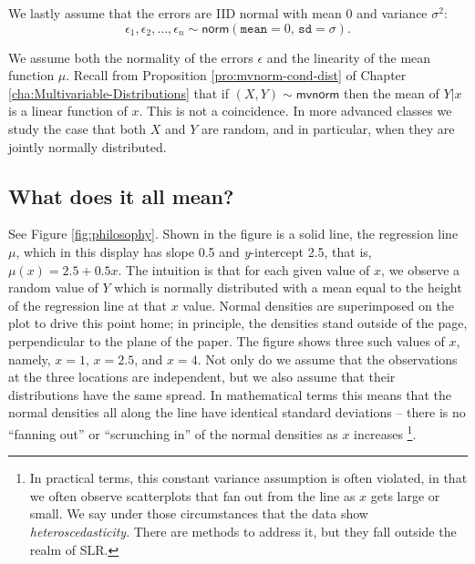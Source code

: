 \documentclass[captions=tableheading]{scrbook}
\begin{document}
\begin{assumption}
We lastly assume that the errors are IID normal with mean 0 and variance \( \sigma^{2} \):
\begin{equation}
\epsilon_{1},\epsilon_{2},\ldots,\epsilon_{n}\sim\mathsf{norm}(\mathtt{mean}=0,\,\mathtt{sd}=\sigma).
\end{equation}
\end{assumption}

\begin{rem}
We assume both the normality of the errors \(\epsilon\) and the linearity of the mean function \( \mu \). Recall from Proposition \ref{pro:mvnorm-cond-dist} of Chapter \ref{cha:Multivariable-Distributions} that if \( (X,Y)\sim\mathsf{mvnorm} \) then the mean of \(Y|x\) is a linear function of \(x\). This is not a coincidence. In more advanced classes we study the case that both \(X\) and \(Y\) are random, and in particular, when they are jointly normally distributed.
\end{rem}
\subsection{What does it all mean?}
\label{sec-1-1-1}

See Figure \ref{fig:philosophy}. Shown in the figure is a solid line, the regression line \(\mu\), which in this display has slope 0.5 and \emph{y}-intercept 2.5, that is, \( \mu(x) = 2.5 + 0.5x \). The intuition is that for each given value of \(x\), we observe a random value of \(Y\) which is normally distributed with a mean equal to the height of the regression line at that \(x\) value. Normal densities are superimposed on the plot to drive this point home; in principle, the densities stand outside of the page, perpendicular to the plane of the paper. The figure shows three such values of \(x\), namely, \( x = 1 \), \( x = 2.5 \), and \( x = 4 \). Not only do we assume that the observations at the three locations are independent, but we also assume that their distributions have the same spread. In mathematical terms this means that the normal densities all along the line have identical standard deviations -- there is no ``fanning out'' or ``scrunching in'' of the normal densities as \(x\) increases
\footnote{In practical terms, this constant variance assumption is often violated, in that we often observe scatterplots that fan out from the line as \(x\) gets large or small. We say under those circumstances that the data show \emph{heteroscedasticity}. There are methods to address it, but they fall outside the realm of SLR.}.
\end{document}
